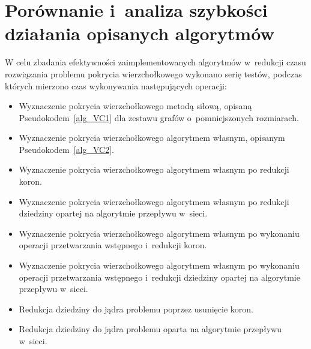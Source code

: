 \section{Porównanie i~analiza szybkości działania opisanych algorytmów}
\par{
  W celu zbadania efektywności zaimplementowanych algorytmów w~redukcji czasu rozwiązania problemu pokrycia wierzchołkowego wykonano serię testów, podczas których mierzono czas wykonywania następujących operacji:

  \begin{itemize}
    \item Wyznaczenie pokrycia wierzchołkowego metodą siłową, opisaną Pseudokodem~\ref{alg_VC1} dla zestawu grafów o~pomniejszonych rozmiarach.
    \item Wyznaczenie pokrycia wierzchołkowego algorytmem własnym, opisanym Pseudokodem~\ref{alg_VC2}.
    \item Wyznaczenie pokrycia wierzchołkowego algorytmem własnym po redukcji koron.
    \item Wyznaczenie pokrycia wierzchołkowego algorytmem własnym po redukcji dziedziny opartej na algorytmie przepływu w~sieci.
    \item Wyznaczenie pokrycia wierzchołkowego algorytmem własnym po wykonaniu operacji przetwarzania wstępnego i~redukcji koron.
    \item Wyznaczenie pokrycia wierzchołkowego algorytmem własnym po wykonaniu operacji przetwarzania wstępnego i~redukcji dziedziny opartej na algorytmie przepływu w~sieci.
    \item Redukcja dziedziny do jądra problemu poprzez usunięcie koron.
    \item Redukcja dziedziny do jądra problemu oparta na algorytmie przepływu w~sieci.
  \end{itemize}
}
